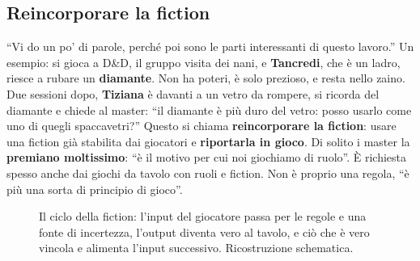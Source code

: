 \subsection{Reincorporare la fiction}

``Vi do un po' di parole, perché poi sono le parti interessanti di questo lavoro.'' Un esempio: si
gioca a D\&D, il gruppo visita dei nani, e \textbf{Tancredi}, che è un ladro, riesce a rubare un
\textbf{diamante}. Non ha poteri, è solo prezioso, e resta nello zaino. Due sessioni dopo,
\textbf{Tiziana} è davanti a un vetro da rompere, si ricorda del diamante e chiede al master:
``il diamante è più duro del vetro: posso usarlo come uno di quegli spaccavetri?'' Questo si chiama
\textbf{reincorporare la fiction}: usare una fiction già stabilita dai giocatori e
\textbf{riportarla in gioco}. Di solito i master la \textbf{premiano moltissimo}: ``è il motivo per
cui noi giochiamo di ruolo''. È richiesta spesso anche dai giochi da tavolo con ruoli e fiction.
Non è proprio una regola, ``è più una sorta di principio di gioco''.

\begin{figure}[htbp]
\centering
{}
\caption{Il ciclo della fiction: l'input del giocatore passa per le regole e una fonte di
incertezza, l'output diventa vero al tavolo, e ciò che è vero vincola e alimenta l'input
successivo. Ricostruzione schematica.}
\label{a16:fig:ciclo}
\end{figure}

